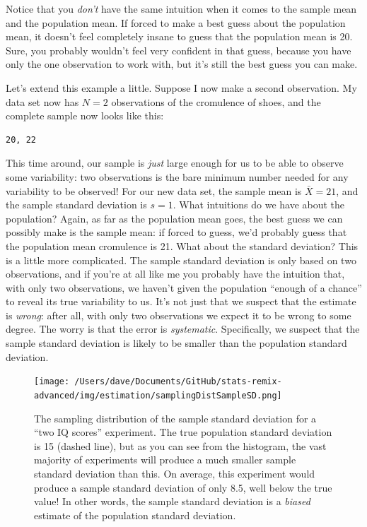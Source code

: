 \documentclass[
]{book}
\begin{document}
Notice that you \emph{don't} have the same intuition when it comes to the sample mean and the population mean. If forced to make a best guess about the population mean, it doesn't feel completely insane to guess that the population mean is 20. Sure, you probably wouldn't feel very confident in that guess, because you have only the one observation to work with, but it's still the best guess you can make.

Let's extend this example a little. Suppose I now make a second observation. My data set now has \(N=2\) observations of the cromulence of shoes, and the complete sample now looks like this:

\begin{verbatim}
20, 22
\end{verbatim}

This time around, our sample is \emph{just} large enough for us to be able to observe some variability: two observations is the bare minimum number needed for any variability to be observed! For our new data set, the sample mean is \(\bar{X}=21\), and the sample standard deviation is \(s=1\). What intuitions do we have about the population? Again, as far as the population mean goes, the best guess we can possibly make is the sample mean: if forced to guess, we'd probably guess that the population mean cromulence is 21. What about the standard deviation? This is a little more complicated. The sample standard deviation is only based on two observations, and if you're at all like me you probably have the intuition that, with only two observations, we haven't given the population ``enough of a chance'' to reveal its true variability to us. It's not just that we suspect that the estimate is \emph{wrong}: after all, with only two observations we expect it to be wrong to some degree. The worry is that the error is \emph{systematic}. Specifically, we suspect that the sample standard deviation is likely to be smaller than the population standard deviation.

\begin{figure}
\centering
\texttt{[image: /Users/dave/Documents/GitHub/stats-remix-advanced/img/estimation/samplingDistSampleSD.png]}
\caption{\label{fig:sampdistsd}The sampling distribution of the sample standard deviation for a ``two IQ scores'' experiment. The true population standard deviation is 15 (dashed line), but as you can see from the histogram, the vast majority of experiments will produce a much smaller sample standard deviation than this. On average, this experiment would produce a sample standard deviation of only 8.5, well below the true value! In other words, the sample standard deviation is a \emph{biased} estimate of the population standard deviation.}
\end{figure}
\end{document}
